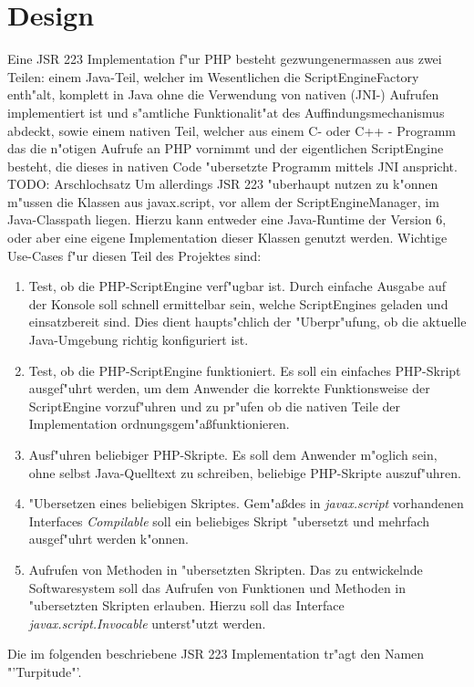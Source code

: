 \section{Design}
\label{sec:chap1:design}

Eine JSR 223 Implementation f"ur PHP besteht gezwungenermassen aus zwei Teilen: einem Java-Teil, welcher im Wesentlichen
die ScriptEngineFactory enth"alt, komplett in Java ohne die Verwendung von nativen (JNI-) Aufrufen implementiert ist und
s"amtliche Funktionalit"at des Auffindungsmechanismus abdeckt, sowie einem nativen Teil, welcher aus 
einem C- oder C++ - Programm das die n"otigen Aufrufe an PHP vornimmt und der eigentlichen ScriptEngine besteht, die dieses in
nativen Code "ubersetzte Programm mittels JNI anspricht. TODO: Arschlochsatz
Um allerdings JSR 223 "uberhaupt nutzen zu k"onnen m"ussen die Klassen aus javax.script, vor allem der ScriptEngineManager, 
im Java-Classpath liegen. Hierzu kann entweder eine Java-Runtime der Version 6, oder aber eine eigene Implementation dieser
Klassen genutzt werden. Wichtige Use-Cases f"ur diesen Teil des Projektes sind:
\begin{enumerate}
\item Test, ob die PHP-ScriptEngine verf"ugbar ist. Durch einfache Ausgabe auf der Konsole soll schnell ermittelbar sein, welche
    ScriptEngines geladen und einsatzbereit sind. Dies dient haupts"chlich der "Uberpr"ufung, ob die aktuelle Java-Umgebung
    richtig konfiguriert ist.
\item Test, ob die PHP-ScriptEngine funktioniert. Es soll ein einfaches PHP-Skript ausgef"uhrt werden, um dem Anwender
    die korrekte Funktionsweise der ScriptEngine vorzuf"uhren und zu pr"ufen ob die nativen Teile der Implementation
    ordnungsgem"a\ss funktionieren.
\item Ausf"uhren beliebiger PHP-Skripte. Es soll dem Anwender m"oglich sein, ohne selbst Java-Quelltext zu schreiben, beliebige
    PHP-Skripte auszuf"uhren.
\item "Ubersetzen eines beliebigen Skriptes. Gem"a\ss des in \emph{javax.script} vorhandenen Interfaces \emph{Compilable} soll 
    ein beliebiges Skript "ubersetzt und mehrfach ausgef"uhrt werden k"onnen.
\item Aufrufen von Methoden in "ubersetzten Skripten. Das zu entwickelnde Softwaresystem soll das Aufrufen von Funktionen und
    Methoden in "ubersetzten Skripten erlauben. Hierzu soll das Interface \emph{javax.script.Invocable} unterst"utzt werden.
\end{enumerate}
Die im folgenden beschriebene JSR 223 Implementation tr"agt den Namen "'Turpitude"'.

